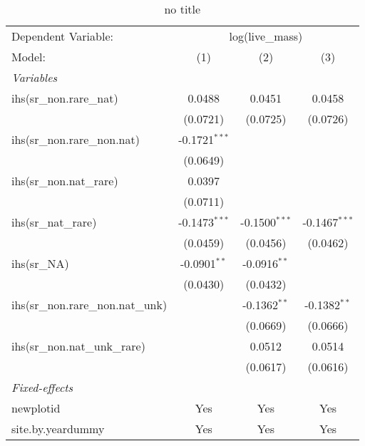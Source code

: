 
\begin{table}[htbp]
   \caption{no title}
   \centering
   \begin{tabular}{lccc}
      \tabularnewline \midrule \midrule
      Dependent Variable: & \multicolumn{3}{c}{log(live\_mass)}\\
      Model:                             & (1)             & (2)             & (3)\\  
      \midrule
      \emph{Variables}\\
      ihs(sr\_non.rare\_nat)             & 0.0488          & 0.0451          & 0.0458\\   
                                         & (0.0721)        & (0.0725)        & (0.0726)\\   
      ihs(sr\_non.rare\_non.nat)         & -0.1721$^{***}$ &                 &   \\   
                                         & (0.0649)        &                 &   \\   
      ihs(sr\_non.nat\_rare)             & 0.0397          &                 &   \\   
                                         & (0.0711)        &                 &   \\   
      ihs(sr\_nat\_rare)                 & -0.1473$^{***}$ & -0.1500$^{***}$ & -0.1467$^{***}$\\   
                                         & (0.0459)        & (0.0456)        & (0.0462)\\   
      ihs(sr\_NA)                        & -0.0901$^{**}$  & -0.0916$^{**}$  &   \\   
                                         & (0.0430)        & (0.0432)        &   \\   
      ihs(sr\_non.rare\_non.nat\_unk)    &                 & -0.1362$^{**}$  & -0.1382$^{**}$\\   
                                         &                 & (0.0669)        & (0.0666)\\   
      ihs(sr\_non.nat\_unk\_rare)        &                 & 0.0512          & 0.0514\\   
                                         &                 & (0.0617)        & (0.0616)\\   
      \midrule
      \emph{Fixed-effects}\\
      newplotid                          & Yes             & Yes             & Yes\\  
      site.by.yeardummy                  & Yes             & Yes             & Yes\\  

\end{tabular}
\end{table}
